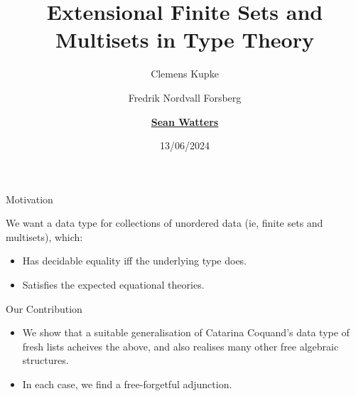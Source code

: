 \documentclass{beamer}
\title[Extenensional Fin. Sets \& Multisets in TT]{Extensional Finite Sets and Multisets in Type Theory}
\author[S. Watters]{Clemens Kupke \and Fredrik Nordvall Forsberg \and \underline{\textbf{Sean Watters}}}
\institute{University of Strathclyde}
\date{13/06/2024}
\newcommand{\xvar}{\AgdaBound{$x$}}
\newcommand{\yvar}{\AgdaBound{$y$}}
\newcommand{\nil}{\AgdaField{$[]$}}
\newcommand{\cons}{\AgdaField{$\dblcolon$}}
\newcommand{\phitm}{\AgdaFunction{$\phi$}}
\newcommand{\datatm}{\AgdaDatatype{Tm}}
\newcommand{\abstm}{\AgdaField{abs}}
\begin{document}
\begin{frame}
  \titlepage{}
\end{frame}

\begin{frame}{Motivation}

  We want a data type for collections of unordered data (ie, finite sets and multisets), which:
  \begin{itemize}
    \item Has decidable equality iff the underlying type does.
    \item Satisfies the expected equational theories.
  \end{itemize}

  \begin{block}{Our Contribution}
  \begin{itemize}
    \item We show that a suitable generalisation of Catarina Coquand's data type of fresh lists acheives the above, and also realises many other free algebraic structures.

    \item In each case, we find a free-forgetful adjunction.
  \end{itemize}
  \end{block}

\end{frame}





\end{document}
